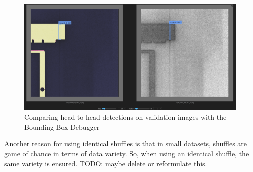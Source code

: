 \begin{figure}
    \centering
    \includegraphics[width=\textwidth]{images/bb_debugger}
    \caption{Comparing head-to-head detections on validation images with the Bounding Box Debugger}
    \label{fig:bb_deb}
\end{figure}

Another reason for using identical shuffles is that in small datasets, shuffles are game of chance in terms of data variety. So, when using an identical shuffle, the same variety is ensured. TODO: maybe delete or reformulate this. \\
